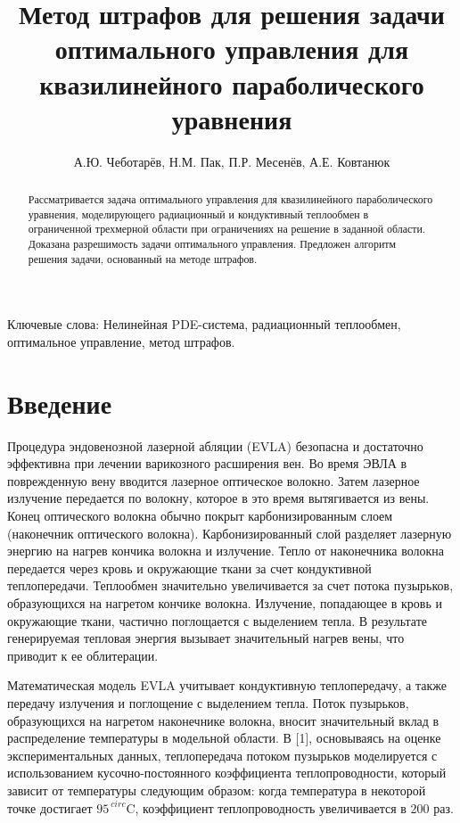 \documentclass[10pt]{article}
\title{Метод штрафов для решения задачи оптимального управления
для квазилинейного параболического уравнения}
\author{А.Ю. Чеботарёв, Н.М. Пак, П.Р. Месенёв, А.Е. Ковтанюк}
\date{}
\begin{document}
    \maketitle
    \begin{abstract}
        Рассматривается задача оптимального управления для квазилинейного параболического уравнения,
        моделирующего радиационный и кондуктивный теплообмен в ограниченной трехмерной области при
        ограничениях на решение в заданной области.
        Доказана разрешимость задачи оптимального управления.
        Предложен алгоритм решения задачи, основанный на методе штрафов.
    \end{abstract}

    Ключевые слова: Нелинейная PDE-система, радиационный теплообмен, оптимальное управление, метод штрафов.


    \section{Введение}
    Процедура эндовенозной лазерной абляции (EVLA) безопасна и достаточно эффективна при
    лечении варикозного расширения вен.
    Во время ЭВЛА в поврежденную вену вводится лазерное оптическое волокно.
    Затем лазерное излучение передается по волокну, которое в это время вытягивается из вены.
    Конец оптического волокна обычно покрыт карбонизированным слоем (наконечник оптического волокна).
    Карбонизированный слой разделяет лазерную энергию на нагрев кончика волокна и излучение.
    Тепло от наконечника волокна передается через кровь и окружающие ткани за счет кондуктивной теплопередачи.
    Теплообмен значительно увеличивается за счет потока пузырьков, образующихся на нагретом кончике волокна.
    Излучение, попадающее в кровь и окружающие ткани, частично поглощается с выделением тепла.
    В результате генерируемая тепловая энергия вызывает значительный нагрев вены, что приводит к ее облитерации.


    Математическая модель EVLA учитывает кондуктивную теплопередачу, а также передачу излучения
    и поглощение с выделением тепла.
    Поток пузырьков, образующихся на нагретом наконечнике волокна,
    вносит значительный вклад в распределение температуры в модельной области.
    В [1], основываясь на оценке экспериментальных данных, теплопередача потоком пузырьков моделируется
    с использованием кусочно-постоянного коэффициента теплопроводности, который зависит от температуры
    следующим образом: когда температура в некоторой точке достигает $95 ^ {\ circ} \mathrm {C}$,
    коэффициент теплопроводность увеличивается в 200 раз.
\end{document}
